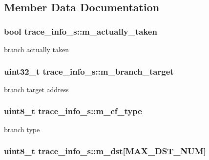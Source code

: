 \subsection{Member Data Documentation}
\hypertarget{structtrace__info__s_a5a5f1935ec0fcdff362542441ce62502}{
\subsubsection[{m\_\-actually\_\-taken}]{\setlength{\rightskip}{0pt plus 5cm}bool {\bf trace\_\-info\_\-s::m\_\-actually\_\-taken}}}
\label{structtrace__info__s_a5a5f1935ec0fcdff362542441ce62502}
branch actually taken \hypertarget{structtrace__info__s_a848124e19a975dfbcbbbfc07f8a38382}{
\subsubsection[{m\_\-branch\_\-target}]{\setlength{\rightskip}{0pt plus 5cm}uint32\_\-t {\bf trace\_\-info\_\-s::m\_\-branch\_\-target}}}
\label{structtrace__info__s_a848124e19a975dfbcbbbfc07f8a38382}
branch target address \hypertarget{structtrace__info__s_a61c3b52e6ea810848586a23c238bf67a}{
\subsubsection[{m\_\-cf\_\-type}]{\setlength{\rightskip}{0pt plus 5cm}uint8\_\-t {\bf trace\_\-info\_\-s::m\_\-cf\_\-type}}}
\label{structtrace__info__s_a61c3b52e6ea810848586a23c238bf67a}
branch type \hypertarget{structtrace__info__s_ae15595e37727861d3722eb4525bfee85}{
\subsubsection[{m\_\-dst}]{\setlength{\rightskip}{0pt plus 5cm}uint8\_\-t {\bf trace\_\-info\_\-s::m\_\-dst}\mbox{[}MAX\_\-DST\_\-NUM\mbox{]}}}
\label{structtrace__info__s_ae15595e37727861d3722eb4525bfee85}
